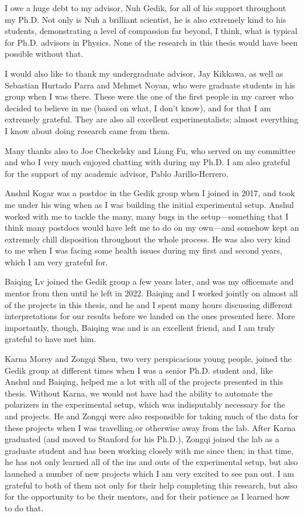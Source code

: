 I owe a huge debt to my advisor, Nuh Gedik, for all of his support throughout my Ph.D.
Not only is Nuh a brilliant scientist, he is also extremely kind to his students, demonstrating a level of compassion far beyond, I think, what is typical for Ph.D. advisors in Physics.
None of the research in this thesis would have been possible without that.

I would also like to thank my undergraduate advisor, Jay Kikkawa, as well as Sebastian Hurtado Parra and Mehmet Noyan, who were graduate students in his group when I was there.
These were the one of the first people in my career who decided to believe in me (based on what, I don't know), and for that I am extremely grateful.
They are also all excellent experimentalists; almost everything I know about doing research came from them.

Many thanks also to Joe Checkelsky and Liang Fu, who served on my committee and who I very much enjoyed chatting with during my Ph.D.
I am also grateful for the support of my academic advisor, Pablo Jarillo-Herrero.

Anshul Kogar was a postdoc in the Gedik group when I joined in \num{2017}, and took me under his wing when as I was building the initial experimental setup.
Anshul worked with me to tackle the many, many bugs in the setup---something that I think many postdocs would have left me to do on my own---and somehow kept an extremely chill disposition throughout the whole process.
He was also very kind to me when I was facing some health issues during my first and second years, which I am very grateful for.

Baiqing Lv joined the Gedik group a few years later, and was my officemate and mentor from then until he left in \num{2022}.
Baiqing and I worked jointly on almost all of the projects in this thesis, and he and I spent many hours discussing different interpretations for our results before we landed on the ones presented here.
More importantly, though, Baiqing was and is an excellent friend, and I am truly grateful to have met him.

Karna Morey and Zongqi Shen, two very perspicacious young people, joined the Gedik group at different times when I was a senior Ph.D. student and, like Anshul and Baiqing, helped me a lot with all of the projects presented in this thesis.
Without Karna, we would not have had the ability to automate the polarizers in the experimental setup, which was indisputably necessary for the  and  projects.
He and Zongqi were also responsible for taking much of the data for these projects when I was travelling or otherwise away from the lab.
After Karna graduated (and moved to Stanford for his Ph.D.), Zongqi joined the lab as a graduate student and has been working closely with me since then; in that time, he has not only learned all of the ins and outs of the experimental setup, but also launched a number of new projects which I am very excited to see pan out.
I am grateful to both of them not only for their help completing this research, but also for the opportunity to be their mentors, and for their patience as I learned how to do that.

